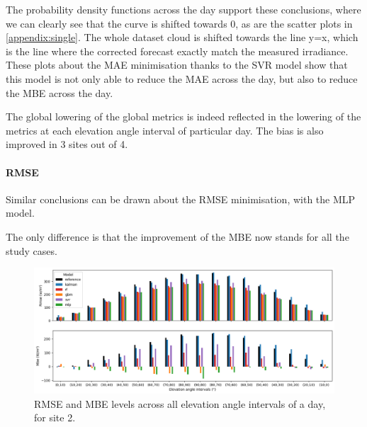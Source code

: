 The probability density functions across the day support these conclusions, where we can clearly see that the curve is shifted towards 0, as are the scatter plots in \autoref{appendix:single}.
The whole dataset cloud is shifted towards the line y=x, which is the line where the corrected forecast exactly match the measured irradiance.\\

These plots about the MAE minimisation thanks to the SVR model show that this model is not only able to reduce the MAE across the day, but also to reduce the MBE across the day.

The global lowering of the global metrics is indeed reflected in the lowering of the metrics at each elevation angle interval of particular day. The bias is also improved in 3 sites out of 4.
\paragraph{RMSE}\indent

Similar conclusions can be drawn about the RMSE minimisation, with the MLP model.

The only difference is that the improvement of the MBE now stands for all the study cases.

\begin{figure}[htb!]
    \centering
    \includegraphics[width=\columnwidth]{figures/first_study/rmse_mbe_site2.png}
\caption{RMSE and MBE levels across all elevation angle intervals of a day, for site 2.}
\end{figure}


